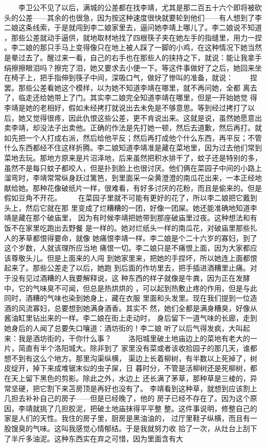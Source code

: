  　　李卫公不见了以后，满城的公差都在找李靖，尤其是那二百五十六个即将被砍 头的公差——其余的也很急，因为按这种速度很快就要轮到他们——有人想到了李 二娘这条线索，于是就闯到李二娘家里去，逼问她李靖上哪儿了。李二娘说不知道 ，那些公差就动手逼供，就地取材地找了四根筷子夹在她左手的指缝里，用力一捏 。李二娘的那只手马上变得像只在地上被人踩了一脚的小鸡，在这种情况下她当然 是晕过去了。醒过来一看，自己的右手也在那些人的挟持之下，就说：能让我拿手 绢擦擦眼泪吗？擦完了泪，她又要求去小便一下。等这件事做好了之后，她回来坐 在椅子上，把手指伸到筷子中间，深吸口气，做好了惨叫的准备，就说： 　　捏罢。那些公差看她这个模样，以为她不知道李靖在哪里，就不再问她，全都 离去了，临走还给她带上了门。其实李二娘完全知道李靖在哪里，但是一开始她觉 得李靖是她的老相好，假如未经拷打就说出去未免是不够意思。等到经过拷打了以 后，她又觉得很疼，因此仇恨这些公差，更不肯说出来。这就是说，虽然她愿意出 卖李靖，却没法子出卖他。正确的作法是先打她一顿，然后去道歉，然后再打。就 如先把一个人打成右派，然后给他平反；然后再打成他个什么东西，再平反；不管 什么东西都经不住这样折腾。李二娘知道李靖准是藏在菜地里，因为过去他们常到 菜地去玩。那地方原来是片沼泽地，后来虽然把积水排干了，蚊子还是特别的多， 虽然不是每只蚊子都咬人，但是扑到脸上也很讨厌。他们俩在菜园子中间的小路上 溜弯时，李靖常常纵身跃过篱笆，到里面采一朵黄澄澄的南瓜花出来，一本正经地 献给她。那种花像破纸片一样，很难看，有好多讨厌的花粉，而且是偷来的。但是 假如豆角不开花。 　　在菜园子里就不可能有更好的花了，所以李二娘把它戴到头上，然后它就在那 里变成了烂糟糟的一团，好像一团屎。她还能准确地知道李靖是藏在那个破庙里， 因为有时候李靖把她带到那座破庙里过夜。这种想法和有饭不在家里吃跑出去野餐 是一样的。她对烂纸头一样的南瓜花，对破庙里那些扎人的茅草都恨得要命，就像 她痛恨李靖一样。李二娘是个二十六岁的寡妇，到了这个岁数，人就该理所应当地 痛恨一切。李二娘只是不痛恨上面，因为大家都应该尊敬头儿。但是上面来的人闯 到她家里来，把她的手捏坏，所以她连上面都恨起来了。那些公差走了以后，她跑 到后面的作坊里去，把手插进酒糟里止痛。对于没有见过酒糟的人我要解释说，这 种东西的样子就像是牛粪，因为正在发酵中，它的气味臭不可闻，但总是热烘烘的 ，可以起到热敷止疼的作用，但是与此同时，酒糟的气味也染到她身上，藏在衣服 里面和头发里。现在我们提到一位造酒的风流寡妇，总要想到她满身酒香。其实不 然，她们全都是满身糟臭，好像从酱油缸里钻出来的一样。李二娘在街上走动时， 身后留下一道气味的长廊，走到她身后的人闻了总要失口嚷道：酒坊街的！李二娘 听了以后气得发疯，大叫起来：我是酒坊街的，干你什么事？ 　　洛阳城里破土地庙边上的菜地有老大的一片，简直有半个洛阳城大。除非到了 家里没有菜或者该收拾园子的那几天，谁都想不到有这么个地方。那里沟渠纵横， 渠边上长着柳树，有半数以上死掉了，树皮绽开，掉下来成堆锯末似的虫子屎，日 暮时分，不管是活柳树还是死柳树，都在天上留下黑色的剪影。除此之外，水边上 还长满了茅草，那种草是三棱的，异常坚硬，把它割下来苫房顶是再好也没有了。 李靖看到这种草，就想到应该割上几担去补补自己的房子——但是已经晚了，他的 房子已经不存在了。因为这个原因，李靖就挑了几担胶泥，把破土地庙抹得平平整 整。这件事说明，修整自己的家是人们的天性。我住的房子里，厨房是黑油油的， 过厅里鞋子纵横，而且有一股馊臭的气味。这叫我感觉心情郁结。于是我就努力收 拾了一次，从灶台上刮下了半斤多油泥。这种东西实在弃之可惜，因为里面含有大 